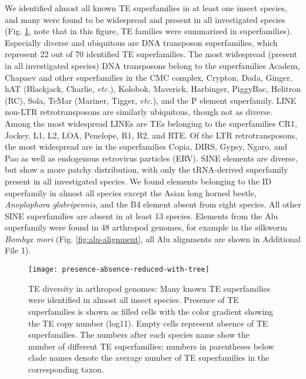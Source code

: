 We identified almost all known TE superfamilies in at least one insect
species, and many were found to be widespread and present in all
investigated species (Fig. \ref{fig:presence-absence}, note that in this figure, TE families were
summarized in superfamilies). Especially diverse and ubiquitous are DNA
transposon superfamilies, which represent 22 out of 70 identified TE
superfamilies. The most widespread (present in all investigated species)
DNA transposons belong to the superfamilies Academ, Chapaev and other
superfamilies in the CMC complex, Crypton, Dada, Ginger, hAT (Blackjack,
Charlie, \emph{etc.}), Kolobok, Maverick, Harbinger, PiggyBac, Helitron
(RC), Sola, TcMar (Mariner, Tigger, \emph{etc.}), and the P element
superfamily. LINE non-LTR retrotransposons are similarly ubiquitous,
though not as diverse. Among the most widespread LINEs are TEs belonging
to the superfamilies CR1, Jockey, L1, L2, LOA, Penelope, R1, R2, and
RTE. Of the LTR retrotransposons, the most widespread are in the
superfamilies Copia, DIRS, Gypsy, Ngaro, and Pao as well as endogenous
retrovirus particles (ERV). SINE elements are diverse, but show a more
patchy distribution, with only the tRNA-derived superfamily present in
all investigated species. We found elements belonging to the ID
superfamily in almost all species except the Asian long horned beetle,
\emph{Anoplophora glabripennis}, and the B4 element absent from eight
species. All other SINE superfamilies are absent in at least 13 species.
Elements from the Alu superfamily were found in 48 arthropod genomes,
for example in the silkworm \emph{Bombyx mori} (Fig. \ref{fig:alu-alignment}, all Alu
alignments are shown in Additional File 1).

\begin{figure}[h!]
\begin{center}
\texttt{[image: presence-absence-reduced-with-tree]}
\caption[TE superfamily diversity in arthropod genomes]{{TE diversity in arthropod genomes: Many known TE superfamilies were
identified in almost all insect species. Presence of TE superfamilies is
shown as filled cells with the color gradient showing the TE copy number
(log11). Empty cells represent absence of TE superfamilies. The numbers
after each species name show the number of different TE superfamilies;
numbers in parentheses below clade names denote the average number of TE
superfamilies in the corresponding taxon.%
\label{fig:presence-absence}
}}
\end{center}
\end{figure}

